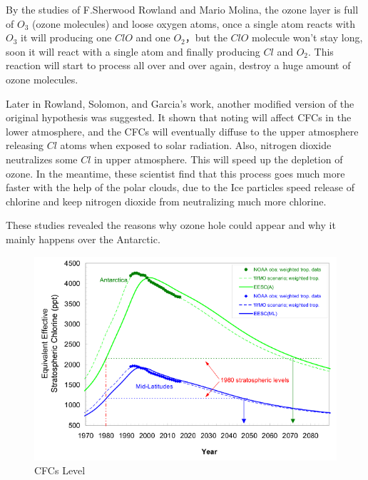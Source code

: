 \documentclass[12pt]{article}
\begin{document}
By the studies of F.Sherwood Rowland and Mario Molina, the ozone layer is full of $O_3$ (ozone molecules) and loose oxygen atoms, once a single atom reacts with $O_3$ it will producing one $ClO$ and one $O_2$，but the $ClO$ molecule won't stay long, soon it will react with a single atom and finally producing $Cl$ and $O_2$. This reaction will start to process all over and over again, destroy a huge amount of ozone molecules.

Later in Rowland, Solomon, and Garcia’s work, another modified version of the original hypothesis was suggested. It shown that noting will affect CFCs in the lower atmosphere, and  the CFCs will eventually diffuse to the upper atmosphere releasing $Cl$ atoms when exposed to solar radiation. Also, nitrogen dioxide neutralizes some $Cl$ in upper atmosphere. This will speed up the depletion of ozone. In the meantime, these scientist find that this process  goes much more faster with the help of the polar clouds, due to the Ice particles speed release of chlorine and keep nitrogen dioxide from neutralizing much more chlorine.

These studies revealed the reasons why ozone hole could appear and why it mainly happens over the Antarctic.

\begin{center}
\begin{figure}[htpb]
\centering
\includegraphics[scale=0.8]{cfc}
\caption{CFCs Level}\label{fig:CFCs Level}
\end{figure}
\end{center}
\end{document}
